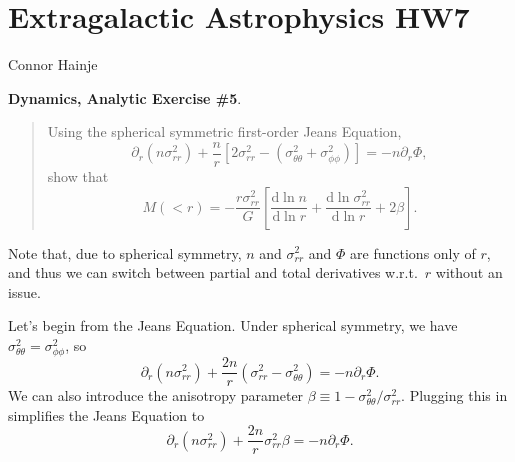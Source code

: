 \documentclass{article}
\renewcommand{\d}{\mathrm{d}}
\begin{document}
{
	\centering
	\section*{Extragalactic Astrophysics HW7}
	Connor Hainje
	\vspace{2em}
	\par
}

\textbf{Dynamics, Analytic Exercise \#5}.

\begin{quote}
	Using the spherical symmetric first-order Jeans Equation,
	\begin{equation}
		\partial_r (n \sigma_{rr}^2)
		+ \frac{n}{r} \left[
			2 \sigma_{rr}^2
			- (\sigma_{\theta\theta}^2 + \sigma_{\phi\phi}^2)
		\right]
		= - n \partial_r \Phi,
	\end{equation}
	show that
	\begin{equation}
		M(<r) = - \frac{r \sigma_{rr}^2}{G} \left[
			\frac{\d \ln n}{\d \ln r}
			+ \frac{\d \ln \sigma_{rr}^2}{\d \ln r}
			+ 2 \beta
		\right].
	\end{equation}
\end{quote}

Note that, due to spherical symmetry, $n$ and $\sigma_{rr}^2$ and $\Phi$ are functions
only of $r$, and thus we can switch between partial and total derivatives
w.r.t.~$r$ without an issue.

Let's begin from the Jeans Equation. Under spherical symmetry, we have
$\sigma_{\theta\theta}^2 = \sigma_{\phi\phi}^2$, so
\begin{equation}
	\partial_r (n \sigma_{rr}^2)
	+ \frac{2 n}{r} \left(
		\sigma_{rr}^2 - \sigma_{\theta\theta}^2
	\right)
	= - n \partial_r \Phi.
\end{equation}
We can also introduce the anisotropy parameter $\beta \equiv 1 -
\sigma_{\theta\theta}^2/\sigma_{rr}^2$. Plugging this in simplifies the Jeans
Equation to
\begin{equation}
	\partial_r (n \sigma_{rr}^2)
	+ \frac{2 n}{r} \sigma_{rr}^2 \beta
	= - n \partial_r \Phi.
\end{equation}
\end{document}
